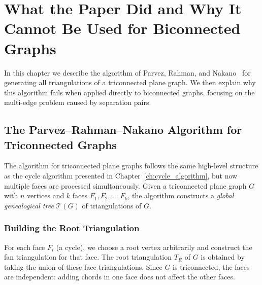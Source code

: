 
\chapter{What the Paper Did and Why It Cannot Be Used for Biconnected Graphs}
\label{ch:paper_limitation}

In this chapter we describe the algorithm of Parvez, Rahman, and Nakano~\cite{parvez2011} for generating all triangulations of a triconnected plane graph. 
We then explain why this algorithm fails when applied directly to biconnected graphs, focusing on the multi-edge problem caused by separation pairs.

\section{The Parvez–Rahman–Nakano Algorithm for Triconnected Graphs}
\label{sec:paper_triconnected}

The algorithm for triconnected plane graphs follows the same high-level structure as the cycle algorithm presented in Chapter~\ref{ch:cycle_algorithm}, but now multiple faces are processed simultaneously. 
Given a triconnected plane graph \(G\) with \(n\) vertices and \(k\) faces \(F_1, F_2, \dots, F_k\), the algorithm constructs a \emph{global genealogical tree} \(\mathcal{T}(G)\) of triangulations of \(G\).

\subsection{Building the Root Triangulation}
\label{subsec:paper_root}

For each face \(F_i\) (a cycle), we choose a root vertex arbitrarily and construct the fan triangulation for that face. 
The root triangulation \(T_R\) of \(G\) is obtained by taking the union of these face triangulations. 
Since \(G\) is triconnected, the faces are independent: adding chords in one face does not affect the other faces.

